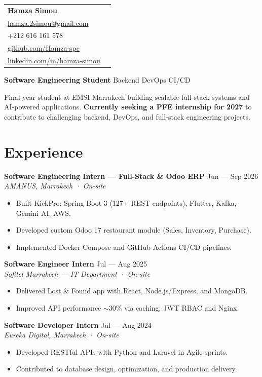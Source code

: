 \documentclass[10.5pt,a4paper]{article}
\newcommand{\role}[4]{%
  \textbf{#1} \hfill {\color{muted}\small #2}\\[-2pt]
  {\color{teal}\textit{#3}}\\[-2pt]
  \begin{itemize}[leftmargin=12pt, nosep, topsep=2pt]
    #4
  \end{itemize}
  \vspace{4pt}
}
\begin{document}
\begin{tabularx}{\textwidth}{@{}X r@{}}
  {\LARGE\bfseries\color{purple} Hamza Simou} &
  \begin{minipage}[t]{0.42\textwidth}\raggedleft\small
    Marrakech, Morocco\\
    \href{mailto:hamza.2simou@gmail.com}{hamza.2simou@gmail.com}\\
    +212 616 161 578\\
    \href{https://github.com/Hamza-spc}{github.com/Hamza-spc}\\
    \href{https://www.linkedin.com/in/hamza-simou-88977a25b/}{linkedin.com/in/hamza-simou}
  \end{minipage}
\end{tabularx}

\vspace{2pt}
{\color{teal}\textbf{Software Engineering Student}} \textbar{} Backend \textbar{} DevOps \textbar{} CI/CD

\vspace{4pt}
\small Final-year student at EMSI Marrakech building scalable full-stack systems and AI-powered applications. \textbf{Currently seeking a PFE internship for 2027} to contribute to challenging backend, DevOps, and full-stack engineering projects.

\section{Experience}
\role{Software Engineering Intern — Full-Stack \& Odoo ERP}{Jun — Sep 2026}{AMANUS, Marrakech · On-site}{
  \item Built KickPro: Spring Boot 3 (127+ REST endpoints), Flutter, Kafka, Gemini AI, AWS.
  \item Developed custom Odoo 17 restaurant module (Sales, Inventory, Purchase).
  \item Implemented Docker Compose and GitHub Actions CI/CD pipelines.
}
\role{Software Engineer Intern}{Jul — Aug 2025}{Sofitel Marrakech — IT Department · On-site}{
  \item Delivered Lost \& Found app with React, Node.js/Express, and MongoDB.
  \item Improved API performance $\sim$30\% via caching; JWT RBAC and Nginx.
}
\role{Software Developer Intern}{Jul — Aug 2024}{Eureka Digital, Marrakech · On-site}{
  \item Developed RESTful APIs with Python and Laravel in Agile sprints.
  \item Contributed to database design, optimization, and production delivery.
}
\end{document}
